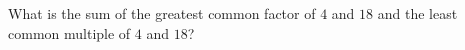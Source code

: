 What is the sum of the greatest common factor of $4$ and $18$ and the least common multiple of $4$ and $18$?
